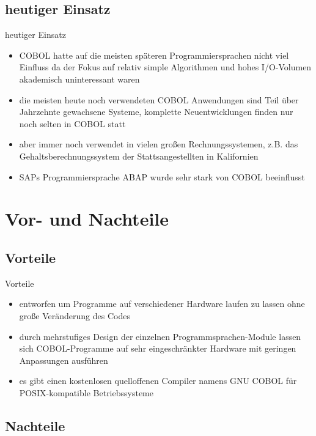 \documentclass{beamer}
\begin{document}
\subsection{heutiger Einsatz}

\begin{frame}{heutiger Einsatz}
	\begin{itemize}
		\item
			COBOL hatte auf die meisten sp\"ateren Programmiersprachen nicht viel Einfluss da der Fokus auf relativ simple Algorithmen und hohes I/O-Volumen akademisch uninteressant waren
		\item
			die meisten heute noch verwendeten COBOL Anwendungen sind Teil \"uber Jahrzehnte gewachsene Systeme, komplette Neuentwicklungen finden nur noch selten in COBOL statt
		\item
			aber immer noch verwendet in vielen großen Rechnungssystemen, z.B. das Gehaltsberechnungssystem der Stattsangestellten in Kalifornien
		\item
			SAPs Programmiersprache ABAP wurde sehr stark von COBOL beeinflusst
	\end{itemize}
\end{frame}

\section{Vor- und Nachteile}

\subsection{Vorteile}

\begin{frame}{Vorteile}
	\begin{itemize}
		\item
			entworfen um Programme auf verschiedener Hardware laufen zu lassen ohne große Ver\"anderung des Codes
		\item
			durch mehrstufiges Design der einzelnen Programmsprachen-Module lassen sich COBOL-Programme auf sehr eingeschr\"ankter Hardware mit geringen Anpassungen ausf\"uhren
		\item
			es gibt einen kostenlosen quelloffenen Compiler namens GNU COBOL für POSIX-kompatible Betriebssysteme
	\end{itemize}
\end{frame}

\subsection{Nachteile}
\end{document}
